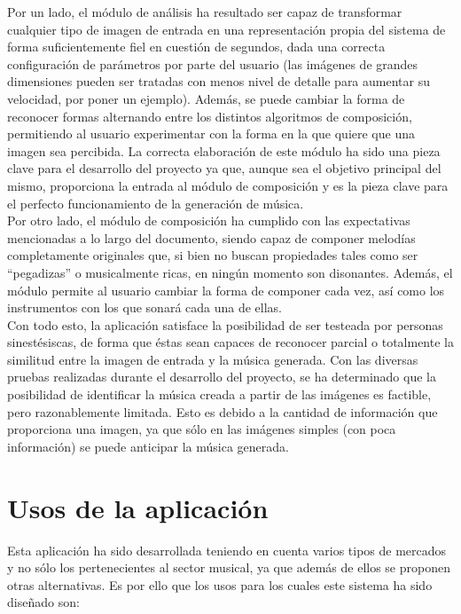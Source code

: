 Por un lado, el módulo de análisis ha resultado ser capaz de transformar cualquier tipo de imagen de entrada en una representación propia del sistema de forma suficientemente fiel en cuestión de segundos, dada una correcta configuración de parámetros por parte del usuario (las imágenes de grandes dimensiones pueden ser tratadas con menos nivel de detalle para aumentar su velocidad, por poner un ejemplo). Además, se puede cambiar la forma de reconocer formas alternando entre los distintos algoritmos de composición, permitiendo al usuario experimentar con la forma en la que quiere que una imagen sea percibida. La correcta elaboración de este módulo ha sido una pieza clave para el desarrollo del proyecto ya que, aunque sea el objetivo principal del mismo, proporciona la entrada al módulo de composición y es la pieza clave para el perfecto funcionamiento de la generación de música.\\

Por otro lado, el módulo de composición ha cumplido con las expectativas mencionadas a lo largo del documento, siendo capaz de componer melodías completamente originales que, si bien no buscan propiedades tales como ser ``pegadizas'' o musicalmente ricas, en ningún momento son disonantes. Además, el módulo permite al usuario cambiar la forma de componer cada vez, así como los instrumentos con los que sonará cada una de ellas.\\

Con todo esto, la aplicación satisface la posibilidad de ser testeada por personas sinestésiscas, de forma que éstas sean capaces de reconocer parcial o totalmente la similitud entre la imagen de entrada y la música generada. Con las diversas pruebas realizadas durante el desarrollo del proyecto, se ha determinado que la posibilidad de identificar la música creada a partir de las imágenes es factible, pero razonablemente limitada. Esto es debido a la cantidad de información que proporciona una imagen, ya que sólo en las imágenes simples (con poca información) se puede anticipar la música generada.\\


\section{Usos de la aplicación}
\label{sec:usos}

Esta aplicación ha sido desarrollada teniendo en cuenta varios tipos de mercados y no sólo los pertenecientes al sector musical, ya que además de ellos se proponen otras alternativas. Es por ello que los usos para los cuales este sistema ha sido diseñado son:

